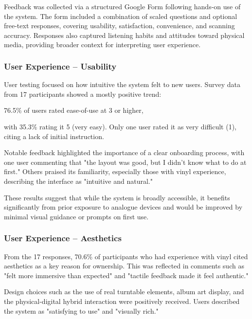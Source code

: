            Feedback was collected via a structured Google Form following hands-on use of the system. The form included a combination of scaled questions and optional free-text responses, covering usability, satisfaction, convenience, and scanning accuracy. Responses also captured listening habits and attitudes toward physical media, providing broader context for interpreting user experience.
        
            \subsubsection{User Experience -- Usability}
                User testing focused on how intuitive the system felt to new users. Survey data from 17 participants showed a mostly positive trend:
                
                    76.5\% of users rated ease-of-use at 3 or higher,
                
                    with 35.3\% rating it 5 (very easy).
                    Only one user rated it as very difficult (1), citing a lack of initial instruction.
                
                Notable feedback highlighted the importance of a clear onboarding process, with one user commenting that "the layout was good, but I didn’t know what to do at first." Others praised its familiarity, especially those with vinyl experience, describing the interface as "intuitive and natural."
                
                These results suggest that while the system is broadly accessible, it benefits significantly from prior exposure to analogue devices and would be improved by minimal visual guidance or prompts on first use.
    
            \subsubsection{User Experience -- Aesthetics}
                From the 17 responses, 70.6\% of participants who had experience with vinyl cited aesthetics as a key reason for ownership. This was reflected in comments such as "felt more immersive than expected" and "tactile feedback made it feel authentic."
    
                Design choices such as the use of real turntable elements, album art display, and the physical-digital hybrid interaction were positively received. Users described the system as "satisfying to use" and "visually rich."
                

